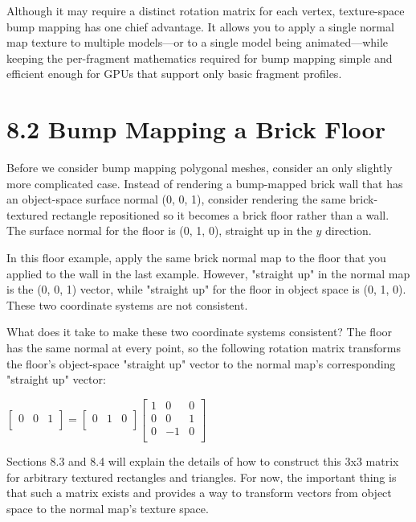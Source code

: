 \documentclass[../main.tex]{subfiles}
\begin{document}
Although it may require a distinct rotation matrix for each vertex, texture-space bump mapping has one chief advantage. It allows you to apply a single normal map texture to multiple models—or to a single model being animated—while keeping the per-fragment mathematics required for bump mapping simple and efficient enough for GPUs that support only basic fragment profiles.

\section{8.2 Bump Mapping a Brick Floor}

Before we consider bump mapping polygonal meshes, consider an only slightly more complicated case. Instead of rendering a bump-mapped brick wall that has an object-space surface normal (0, 0, 1), consider rendering the same brick-textured rectangle repositioned so it becomes a brick floor rather than a wall. The surface normal for the floor is (0, 1, 0), straight up in the $y$ direction.

In this floor example, apply the same brick normal map to the floor that you applied to the wall in the last example. However, "straight up" in the normal map is the (0, 0, 1) vector, while "straight up" for the floor in object space is (0, 1, 0). These two coordinate systems are not consistent.

What does it take to make these two coordinate systems consistent? The floor has the same normal at every point, so the following rotation matrix transforms the floor's object-space "straight up" vector to the normal map's corresponding "straight up" vector:

$
\begin{bmatrix} 0 & 0 & 1 \\ \end{bmatrix}
=
\begin{bmatrix} 0 & 1 & 0 \\ \end{bmatrix}
\begin{bmatrix} 1 & 0 & 0 \\ 0 & 0 & 1 \\ 0 & -1 & 0 \\ \end{bmatrix}
$

Sections 8.3 and 8.4 will explain the details of how to construct this 3x3 matrix for arbitrary textured rectangles and triangles. For now, the important thing is that such a matrix exists and provides a way to transform vectors from object space to the normal map's texture space.
\end{document}
